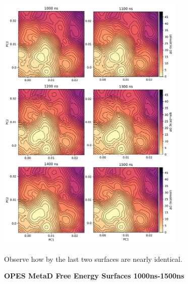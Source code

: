 \begin{figure}
	\begin{center}
		\includegraphics[width=0.8\textwidth]{figures/opening/convergence_2.pdf}
	\end{center}
	\captionsetup{singlelinecheck = false, justification=raggedright}
	\caption[OPES MetaD Free Energy Surfaces 1000ns-1500ns] {\textbf{OPES MetaD Free Energy Surfaces 1000ns-1500ns}}{Observe how by the last two surfaces are nearly identical. } 
	\label{convergence_opes_2}
\end{figure}

